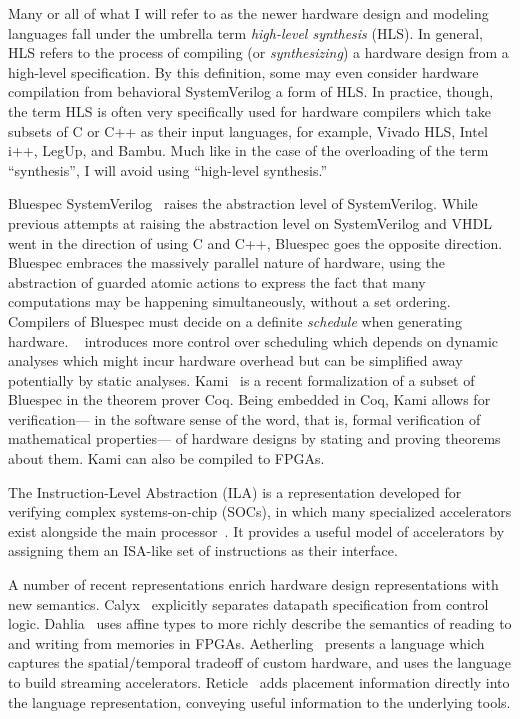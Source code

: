 Many or all of what I will refer to
  as the newer hardware design
  and modeling languages
  fall under the umbrella term
  \textit{high-level synthesis} (HLS).
In general,
  HLS refers
  to the process of compiling
  (or \textit{synthesizing})
  a hardware design
  from a
  high-level specification.
By this definition,
  some may even consider
  hardware compilation
  from behavioral
  SystemVerilog
  a form of HLS.
In practice, though,
  the term HLS
  is often very specifically used
  for hardware compilers
  which take subsets of C or C++
  as their input languages,
  for example,
  Vivado HLS, Intel i++, LegUp, and Bambu.
Much like in the case of
  the overloading
  of the term ``synthesis'', 
  I will avoid using
  ``high-level synthesis.''
  
Bluespec SystemVerilog~\cite{nikhil2004bluespec}
  raises the abstraction level
  of SystemVerilog.
While previous attempts
  at raising the abstraction level
  on SystemVerilog and VHDL
  went in the direction
  of using C and C++,
  Bluespec goes the opposite direction.
Bluespec embraces
  the massively parallel nature
  of hardware,
  using the abstraction of
  guarded atomic actions
  to express
  the fact that 
  many computations
  may be happening simultaneously,
  without a set ordering.
Compilers of Bluespec
  must decide on a
  definite
  \textit{schedule}
  when generating hardware.
\koika~\cite{bourgeat2020essence} introduces
  more control over scheduling
  which depends on dynamic analyses
  which might incur hardware overhead
  but can be simplified away
  potentially by static analyses.
Kami~\cite{choi2017kami}
  is a recent formalization
  of a subset of Bluespec
  in the theorem prover Coq.
Being embedded in Coq,
  Kami allows for 
  verification---%
  in the software sense of the word,
  that is, formal verification
  of mathematical properties---%
  of hardware designs
  by stating and proving theorems
  about them.
Kami can also be compiled
  to FPGAs.


The Instruction-Level Abstraction (ILA)
  is a representation developed
  for verifying complex
  systems-on-chip (SOCs),
  in which many specialized
  accelerators
  exist alongside
  the main processor~\cite{huang2018instruction}.
It provides a useful model of accelerators
  by assigning them
  an ISA-like
  set of instructions
  as their interface.

A number of recent representations
  enrich
   hardware design representations
  with new semantics.
Calyx~\cite{nigam2021compiler}
  explicitly separates
  datapath specification
  from control logic.
Dahlia~\cite{nigam2020predictable}
  uses affine types
  to more richly describe
  the semantics of
  reading to 
  and writing from
  memories
  in FPGAs.
Aetherling~\cite{durst2020type}
  presents a
  language
  which captures
  the spatial/temporal tradeoff
  of custom hardware,
  and uses the language
  to build streaming accelerators.
Reticle~\cite{vega2021reticle}
  adds placement information
  directly into the language
  representation,
  conveying useful information
  to the underlying tools.
  
